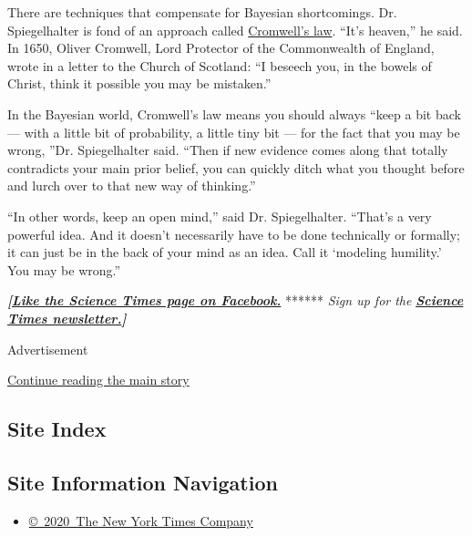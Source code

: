 There are techniques that compensate for Bayesian shortcomings. Dr.
Spiegelhalter is fond of an approach called
\href{https://understandinguncertainty.org/node/97}{Cromwell's law}.
``It's heaven,'' he said. In 1650, Oliver Cromwell, Lord Protector of
the Commonwealth of England, wrote in a letter to the Church of
Scotland: ``I beseech you, in the bowels of Christ, think it possible
you may be mistaken.''

In the Bayesian world, Cromwell's law means you should always ``keep a
bit back --- with a little bit of probability, a little tiny bit --- for
the fact that you may be wrong, ''Dr. Spiegelhalter said. ``Then if new
evidence comes along that totally contradicts your main prior belief,
you can quickly ditch what you thought before and lurch over to that new
way of thinking.''

``In other words, keep an open mind,'' said Dr. Spiegelhalter. ``That's
a very powerful idea. And it doesn't necessarily have to be done
technically or formally; it can just be in the back of your mind as an
idea. Call it `modeling humility.' You may be wrong.''

\textbf{\emph{{[}}\href{http://on.fb.me/1paTQ1h}{\emph{Like the Science
Times page on Facebook.}}} ****** \emph{\textbar{} Sign up for the}
\textbf{\href{http://nyti.ms/1MbHaRU}{\emph{Science Times
newsletter.}}\emph{{]}}}

Advertisement

\protect\hyperlink{after-bottom}{Continue reading the main story}

\hypertarget{site-index}{%
\subsection{Site Index}\label{site-index}}

\hypertarget{site-information-navigation}{%
\subsection{Site Information
Navigation}\label{site-information-navigation}}

\begin{itemize}
\tightlist
\item
  \href{https://help.nytimes3xbfgragh.onion/hc/en-us/articles/115014792127-Copyright-notice}{©~2020~The
  New York Times Company}
\end{itemize}

